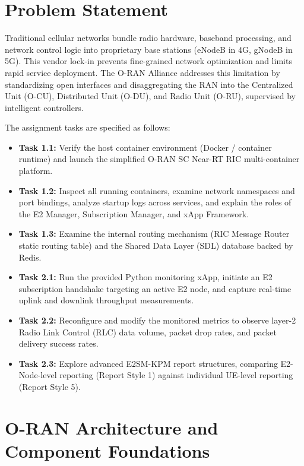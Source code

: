 \documentclass[11pt,a4paper]{article}
\begin{document}
\section{Problem Statement}

Traditional cellular networks bundle radio hardware, baseband processing, and network control logic into proprietary base stations (eNodeB in 4G, gNodeB in 5G). This vendor lock-in prevents fine-grained network optimization and limits rapid service deployment. The O-RAN Alliance addresses this limitation by standardizing open interfaces and disaggregating the RAN into the Centralized Unit (O-CU), Distributed Unit (O-DU), and Radio Unit (O-RU), supervised by intelligent controllers.

The assignment tasks are specified as follows:
\begin{itemize}
  \item \textbf{Task 1.1:} Verify the host container environment (Docker / container runtime) and launch the simplified O-RAN SC Near-RT RIC multi-container platform.
  \item \textbf{Task 1.2:} Inspect all running containers, examine network namespaces and port bindings, analyze startup logs across services, and explain the roles of the E2 Manager, Subscription Manager, and xApp Framework.
  \item \textbf{Task 1.3:} Examine the internal routing mechanism (RIC Message Router static routing table) and the Shared Data Layer (SDL) database backed by Redis.
  \item \textbf{Task 2.1:} Run the provided Python monitoring xApp, initiate an E2 subscription handshake targeting an active E2 node, and capture real-time uplink and downlink throughput measurements.
  \item \textbf{Task 2.2:} Reconfigure and modify the monitored metrics to observe layer-2 Radio Link Control (RLC) data volume, packet drop rates, and packet delivery success rates.
  \item \textbf{Task 2.3:} Explore advanced E2SM-KPM report structures, comparing E2-Node-level reporting (Report Style 1) against individual UE-level reporting (Report Style 5).
\end{itemize}

\section{O-RAN Architecture and Component Foundations}
\end{document}
